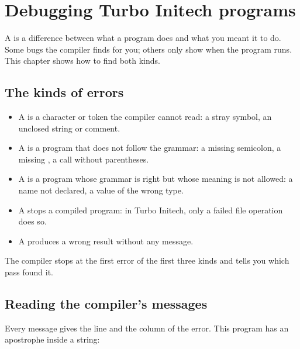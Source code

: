 \chapter{Debugging Turbo Initech programs}

A  is a difference between what a program does and what you
meant it to do.  Some bugs the compiler finds for you; others only show
when the program runs.  This chapter shows how to find both kinds.

\section{The kinds of errors}
\begin{itemize}
\item A  is a character or token the compiler cannot
  read: a stray symbol, an unclosed string or comment.
\item A  is a program that does not follow the grammar:
  a missing semicolon, a missing , a call without parentheses.
\item A  is a program whose grammar is right but whose
  meaning is not allowed: a name not declared, a value of the wrong type.
\item A  stops a compiled program: in Turbo Initech,
  only a failed file operation does so.
\item A  produces a wrong result without any message.
\end{itemize}

The compiler stops at the first error of the first three kinds and tells
you which pass found it.

\section{Reading the compiler's messages}
Every message gives the line and the column of the error.  This program
has an apostrophe inside a string:

